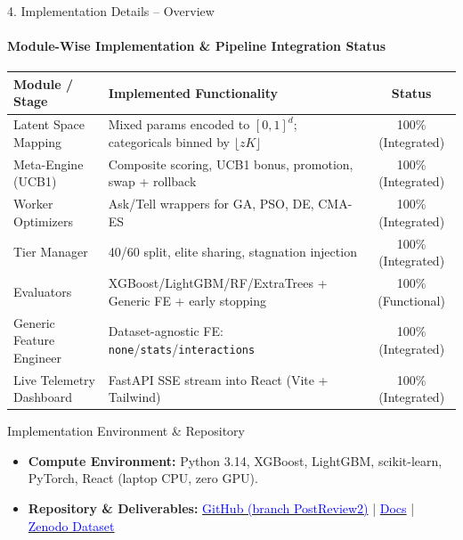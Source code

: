 \documentclass[aspectratio=169, 11pt]{beamer}
\begin{document}
\begin{frame}{4. Implementation Details -- Overview}
    \framesubtitle{Module-Wise Implementation \& Pipeline Integration Status}
    \vspace{-0.15cm}
    \begin{table}
        \centering
        \tiny
        \renewcommand{\arraystretch}{1.1}
        \begin{tabular}{p{3.2cm} p{7.4cm} c}
            \toprule
            \textbf{Module / Stage} & \textbf{Implemented Functionality} & \textbf{Status} \\
            \midrule
            Latent Space Mapping & Mixed params encoded to $[0,1]^d$; categoricals binned by $\lfloor zK\rfloor$ & 100\% (Integrated) \\
            Meta-Engine (UCB1) & Composite scoring, UCB1 bonus, promotion, swap + rollback & 100\% (Integrated) \\
            Worker Optimizers & Ask/Tell wrappers for GA, PSO, DE, CMA-ES & 100\% (Integrated) \\
            Tier Manager & 40/60 split, elite sharing, stagnation injection & 100\% (Integrated) \\
            Evaluators & XGBoost/LightGBM/RF/ExtraTrees + Generic FE + early stopping & 100\% (Functional) \\
            Generic Feature Engineer & Dataset-agnostic FE: \texttt{none}/\texttt{stats}/\texttt{interactions} & 100\% (Integrated) \\
            Live Telemetry Dashboard & FastAPI SSE stream into React (Vite + Tailwind) & 100\% (Integrated) \\
            \bottomrule
        \end{tabular}
    \end{table}
    \vspace{-0.2cm}

    \begin{block}{Implementation Environment \& Repository}
        \scriptsize
        \begin{itemize}
            \setlength{\itemsep}{1pt}
            \item \textbf{Compute Environment:} Python 3.14, XGBoost, LightGBM, scikit-learn, PyTorch, React (laptop CPU, zero GPU).
            \item \textbf{Repository \& Deliverables:} \href{https://github.com/paarthureddy/EvoSynth}{\textcolor{blue}{GitHub (branch PostReview2)}} \quad | \quad \href{https://evosynth-2027.github.io/evosynth-docs/}{\textcolor{blue}{Docs}} \quad | \quad \href{https://doi.org/10.5281/zenodo.23645119}{\textcolor{blue}{Zenodo Dataset}}
        \end{itemize}
    \end{block}
\end{frame}
\end{document}
